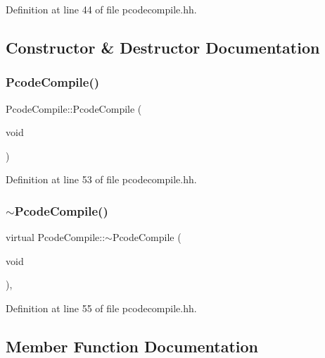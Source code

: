 Definition at line 44 of file pcodecompile.\+hh.



\subsection{Constructor \& Destructor Documentation}
\mbox{\label{class_pcode_compile_ace772524dfca64b26fec82e7edd752b0}} 
\subsubsection{\texorpdfstring{PcodeCompile()}{PcodeCompile()}}
{\footnotesize\ttfamily Pcode\+Compile\+::\+Pcode\+Compile (\begin{DoxyParamCaption}\item[{void}]{ }\end{DoxyParamCaption})\hspace{0.3cm}{\ttfamily [inline]}}



Definition at line 53 of file pcodecompile.\+hh.

\mbox{\label{class_pcode_compile_a26e89dcca4144f9bd91fcdd7af756177}} 
\subsubsection{\texorpdfstring{$\sim$PcodeCompile()}{~PcodeCompile()}}
{\footnotesize\ttfamily virtual Pcode\+Compile\+::$\sim$\+Pcode\+Compile (\begin{DoxyParamCaption}\item[{void}]{ }\end{DoxyParamCaption})\hspace{0.3cm}{\ttfamily [inline]}, {\ttfamily [virtual]}}



Definition at line 55 of file pcodecompile.\+hh.



\subsection{Member Function Documentation}
\mbox{\label{class_pcode_compile_a31003fa38370385ed889845d9616ba15}} 
